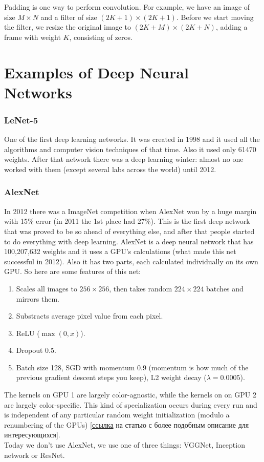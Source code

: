 Padding is one way to perform convolution. For example, we have an image of size $M\times N$ and a filter of size $(2K+1)\times(2K+1)$. Before we start moving the filter, we resize the original image to $(2K+M)\times(2K+N)$, adding a frame with weight $K$, consisting of zeros.

\section{Examples of Deep Neural Networks}
\vspace{-0.6cm}
\subsubsection*{LeNet-5}

One of the first deep learning networks. It was created in 1998 and it used all the algorithms and computer vision techniques of that time. Also it used only 61470 weights. After that network there was a deep learning winter: almost no one worked with them (except several labs across the world) until 2012.

\subsubsection*{AlexNet}

In 2012 there was a ImageNet competition when AlexNet won by a huge margin with 15\% error (in 2011 the 1st place had 27\%). This is the first deep network that was proved to be so ahead of everything else, and after that people started to do everything with deep learning.
AlexNet is a deep neural network that has 100,207,632 weights and it uses a GPU's calculations (what made this net successful in 2012). Also it has two parts, each calculated individually on its own GPU. So here are some features of this net:\\
\begin{enumerate}[label=$\bullet$]
  \item Scales all images to $256\times256$, then takes random $224\times224$ batches and mirrors them.
  \item Substracts average pixel value from each pixel.
  \item ReLU ($\max(0,x)$).
  \item Dropout 0.5.
  \item Batch size 128, SGD with momentum 0.9 (momentum is how much of the previous gradient descent steps you keep), L2 weight decay ($\lambda=0.0005$).
\end{enumerate}
The kernels on GPU 1 are largely color-agnostic, while the kernels on on GPU 2 are largely color-specific. This kind of specialization occurs during every run and is independent of any particular random weight initialization (modulo a renumbering of the GPUs) [\href{https://www.nvidia.cn/content/tesla/pdf/machine-learning/imagenet-classification-with-deep-convolutional-nn.pdf}{ссылка} на статью с более подобным описание для интересующихся].\\
Today we don't use AlexNet, we use one of three things: VGGNet, Inception network or ResNet.

